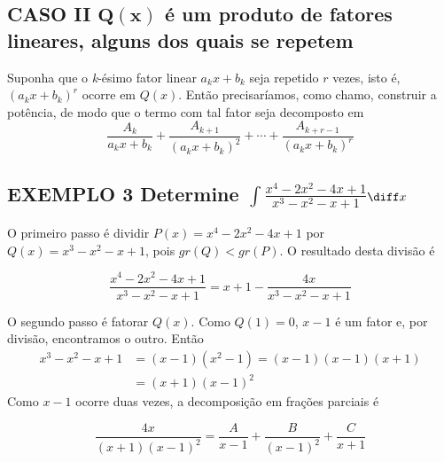 \documentclass[a4paper, 12pt]{extreport}
\begin{document}
    \vspace{10mm}
    \subsection*{\small CASO II $\mathbf{Q(x)}$ é um produto de fatores lineares, alguns dos quais se repetem}
      Suponha que o \textsl{k}-ésimo fator linear $a_kx+b_k$ seja repetido $r$ vezes, isto é, $(a_kx+b_k)^r$ ocorre em $Q(x)$. Então precisaríamos, como chamo,
      construir a potência, de modo que o termo com tal fator seja decomposto em
      $$ \frac{A_k}{a_kx+b_k} + \frac{A_{k+1}}{(a_kx+b_k)^2} + \cdots + \frac{A_{k+r-1}}{(a_kx+b_k)^r} $$

      \subsection*{\small {\color{astral}EXEMPLO 3} \textmd{Determine \large$\int{\frac{x^4-2x^2-4x+1}{x^3-x^2-x+1}}$\normalsize$\diff x$}}
        O primeiro passo é dividir $P(x) = x^4-2x^2-4x+1$ por $Q(x)= x^3-x^2-x+1$, pois $gr(Q) < gr(P)$. O resultado desta divisão é

        $$ \frac{x^4-2x^2-4x+1}{x^3-x^2-x+1} = x+1-\frac{4x}{x^3-x^2-x+1} $$

        \vspace{3mm}
        \noindent O segundo passo é fatorar $Q(x)$. Como $Q(1) = 0$, $x-1$ é um fator e, por divisão, encontramos o outro. Então
        \begin{equation*}
          \begin{split}
            x^3-x^2-x+1 & = (x-1)(x^2-1) = (x-1)(x-1)(x+1) \\
                        & = (x+1)(x-1)^2
          \end{split}
        \end{equation*}
        Como $x-1$ ocorre duas vezes, a decomposição em frações parciais é

        $$ \frac{4x}{(x+1)(x-1)^2} = \frac{A}{x-1} + \frac{B}{(x-1)^2} + \frac{C}{x+1} $$
\end{document}
